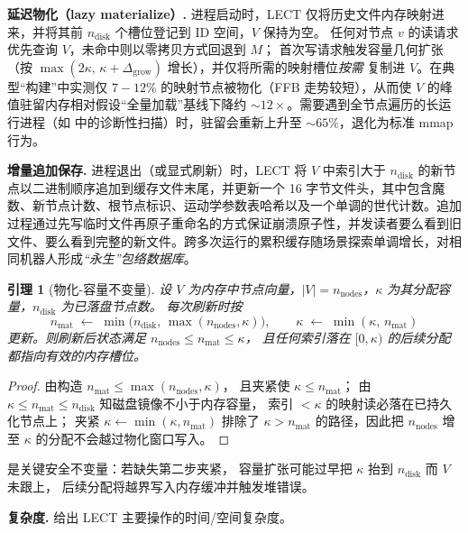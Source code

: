 \documentclass[journal]{IEEEtran}
\newtheorem{lemma}{引理}
\begin{document}
\textbf{延迟物化（lazy materialize）.}
进程启动时，LECT 仅将历史文件内存映射进来，并将其前 $n_\text{disk}$ 个槽位登记到 ID 空间，$V$ 保持为空。
任何对节点 $v$ 的读请求优先查询 $V$，未命中则以零拷贝方式回退到 $M$；
首次写请求触发容量几何扩张（按 $\max(2\kappa,\,\kappa+\Delta_\text{grow})$ 增长），并仅将所需的映射槽位\emph{按需} 复制进 $V$。在典型“构建”中实测仅 $7\!-\!12\%$ 的映射节点被物化（FFB 走势较短），从而使 $V$ 的峰值驻留内存相对假设“全量加载”基线下降约 ${\sim}12\times$。需要遇到全节点遍历的长运行进程（如  中的诊断性扫描）时，驻留会重新上升至 ${\sim}65\%$，退化为标准 mmap 行为。

\textbf{增量追加保存.}
进程退出（或显式刷新）时，LECT 将 $V$ 中索引大于 $n_\text{disk}$ 的新节点以二进制顺序追加到缓存文件末尾，并更新一个 16 字节文件头，其中包含魔数、新节点计数、根节点标识、运动学参数表哈希以及一个单调的世代计数。追加过程通过先写临时文件再原子重命名的方式保证崩溃原子性，并发读者要么看到旧文件、要么看到完整的新文件。跨多次运行的累积缓存随场景探索单调增长，对相同机器人形成\emph{“永生”包络数据库}。

\begin{lemma}[物化-容量不变量]\label{lem:lect_invariant}
设 $V$ 为内存中节点向量，$|V|=n_\text{nodes}$，$\kappa$ 为其分配容量，$n_\text{disk}$ 为已落盘节点数。
每次刷新时按
\begin{equation}\label{eq:lect_invariant}
n_\text{mat}\;\leftarrow\;\min\!\bigl(n_\text{disk},\,\max(n_\text{nodes},\kappa)\bigr),
\qquad
\kappa\;\leftarrow\;\min(\kappa,\,n_\text{mat})
\end{equation}
更新。则刷新后状态满足 $n_\text{nodes}\le n_\text{mat}\le\kappa$，
且任何索引落在 $[0,\kappa)$ 的后续分配都指向有效的内存槽位。
\end{lemma}

\begin{proof}
由构造 $n_\text{mat}\le\max(n_\text{nodes},\kappa)$，
且夹紧使 $\kappa\le n_\text{mat}$；
由 $\kappa\le n_\text{mat}\le n_\text{disk}$ 知磁盘镜像不小于内存容量，
索引 $<\kappa$ 的映射读必落在已持久化节点上；
夹紧 $\kappa\leftarrow\min(\kappa,n_\text{mat})$ 排除了
$\kappa>n_\text{mat}$ 的路径，因此把 $n_\text{nodes}$ 增至 $\kappa$
的分配不会越过物化窗口写入。
\end{proof}

 是关键安全不变量：若缺失第二步夹紧，
容量扩张可能过早把 $\kappa$ 抬到 $n_\text{disk}$ 而 $V$ 未跟上，
后续分配将越界写入内存缓冲并触发堆错误。

\textbf{复杂度.}
 给出 LECT 主要操作的时间/空间复杂度。
\end{document}
